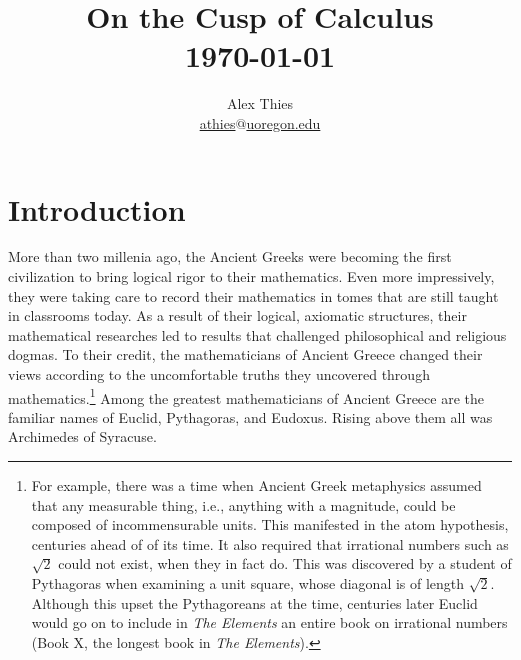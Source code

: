 \documentclass[letterpaper, 12pt]{amsart}
\theoremstyle{definition}  %
\begin{document}
	\title{On the Cusp of Calculus \\ \today}
	\author{Alex Thies \\ \href{mailto:athies@uoregon.edu}{\lowercase{athies$@$uoregon.edu}}}

	\maketitle
	\newpage

	\setcounter{tocdepth}{1}
	\tableofcontents
	\newpage

	\section{Introduction}
	\label{sec:introduction}
	More than two millenia ago, the Ancient Greeks were becoming the first civilization to bring logical rigor to their mathematics.
	Even more impressively, they were taking care to record their mathematics in tomes that are still taught in classrooms today.
	As a result of their logical, axiomatic structures, their mathematical researches led to results that challenged philosophical and religious dogmas.
	To their credit, the mathematicians of Ancient Greece changed their views according to the uncomfortable truths they uncovered through mathematics.\footnote{For example, there was a time when Ancient Greek metaphysics assumed that any measurable thing, i.e., anything with a magnitude, could be composed of incommensurable units. This manifested in the atom hypothesis, centuries ahead of of its time. It also required that irrational numbers such as $\sqrt{2}$ could not exist, when they in fact do. This was discovered by a student of Pythagoras when examining a unit square, whose diagonal is of length $\sqrt{2}$. Although this upset the Pythagoreans at the time, centuries later Euclid would go on to include in \textit{The Elements} an entire book on irrational numbers (Book X, the longest book in \textit{The Elements}).}
	Among the greatest mathematicians of Ancient Greece are the familiar names of Euclid, Pythagoras, and Eudoxus.
	Rising above them all was Archimedes of Syracuse.
\end{document}
